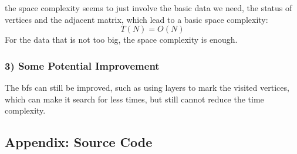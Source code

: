 \documentclass{article}
\begin{document}
the space complexity seems to just involve the basic data we need, the status of vertices and the adjacent matrix, which lead to a basic space complexity:$$T(N)=O(N)$$
For the data that is not too big, the space complexity is enough.

\subsubsection*{3) Some Potential Improvement}

The bfs can still be improved, such as using layers to mark the visited vertices, which can make it search for less times, but still cannot reduce the time complexity.

\subsection*{\bf Appendix: Source Code}
\end{document}

